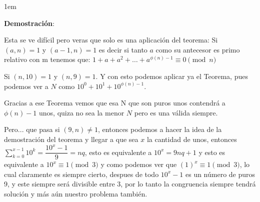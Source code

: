 \documentclass[12pt, fleqn]{article}                             %
\newenvironment{SmallIndentation}[1][0.75em]                    %
    {\begin{adjustwidth}{#1}{}\begin{footnotesize}}                 %
    {\end{footnotesize}\end{adjustwidth}}                           %
\begin{document}
    \begin{SmallIndentation}[1em]
        \textbf{Demostración}:
        
        Esta se ve difícil pero veras que solo es una aplicación del teorema:
        Si $(a, n) = 1$ y $(a-1, n) = 1$ es decir si tanto $a$ como su antecesor es primo
        relativo con m tenemos que:
        $1 + a + a^2 + \dots + a^{\phi(n)-1} \equiv 0 \pmod{n}$

        Si $(n,10)=1$ y $(n,9)=1$. Y con esto podemos aplicar ya el Teorema, pues podemos ver a 
        $N$ como $10^0 + 10^1 + 10^{\phi(n)-1}$.

        Gracias a ese Teorema vemos que esa N que son puros unos contendrá a $\phi(n)-1$ unos, quiza
        no sea la menor $N$ pero es una válida siempre.

        Pero... que pasa si $(9, n) \neq 1$, entonces podemos a hacer la idea de la demostración del teorema y
        llegar a que sea $x$ la cantidad de unos, entonces $\sum_{k=0}^{x-1} 10^k = \dfrac{10^x-1}{9} = nq$, 
        esto es equivalente a $10^x = 9nq +1$ y esto es equivalente a $10^x \equiv 1 \pmod{3}$ y como
        podemos ver que $(1)^x \equiv 1 \pmod{3}$, lo cual claramente es siempre cierto, despues de todo
        $10^x-1$ es un número de puros 9, y este siempre será divisible entre $3$, por lo tanto la congruencia
        siempre tendrá solución y más aún nuestro problema también.
    
    \end{SmallIndentation}
        
\end{document}
